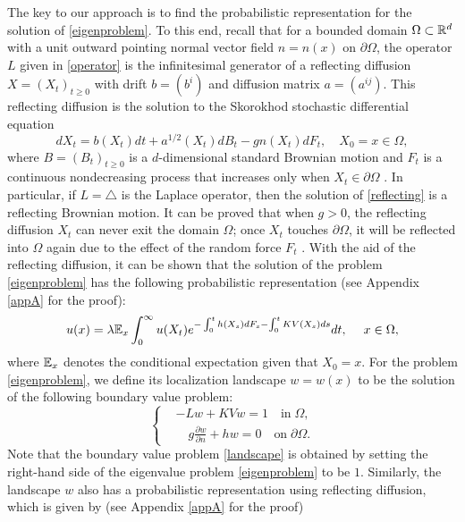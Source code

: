 \documentclass[a4paper,11pt]{article}
\begin{document}
The key to our approach is to find the probabilistic representation for the solution of \eqref{eigenproblem}. To this end, recall that for a bounded domain $\Omega \subset \mathbb{R}^d$ with a unit outward pointing normal vector field $n = n(x)$ on $\partial \Omega$, the operator $L$ given in \eqref{operator} is the infinitesimal generator of a reflecting diffusion $X = (X_t)_{t \geq 0}$ with drift $b = (b^i)$ and diffusion matrix $a = (a^{ij})$. This reflecting diffusion is the solution to the Skorokhod stochastic differential equation
\begin{equation}\label{reflecting}
dX_t = b(X_t) dt + a^{1/2}(X_t) d B_t - g n(X_t) d F_t, \quad X_0 = x\in\Omega,
\end{equation}
where $B = (B_t)_{t\geq 0}$ is a $d$-dimensional standard Brownian motion and $F_t$ is a continuous nondecreasing process that increases only when $X_t \in \partial \Omega$ \cite{1998Diffusions}. In particular, if $L = \triangle$ is the Laplace operator, then the solution of \eqref{reflecting} is a reflecting Brownian motion. It can be proved that when $g > 0$, the reflecting diffusion $X_t$ can never exit the domain $\Omega$; once $X_t$ touches $\partial \Omega$, it will be reflected into $\Omega$ again due to the effect of the random force $F_t$ \cite{1998Diffusions}. With the aid of the reflecting diffusion, it can be shown that the solution of the problem \eqref{eigenproblem} has the following probabilistic representation (see Appendix \ref{appA} for the proof):
\begin{equation}\label{probeigen}
u(x) = \lambda \mathbb{E}_x \int_{0}^{\infty} u(X_t) e^{- \int_{0}^{t} h(X_s) d F_s - \int_{0}^{t} K V(X_s) ds} dt, \quad \; x \in \Omega,
\end{equation}
where $\mathbb{E}_x$ denotes the conditional expectation given that $X_0 = x$. For the problem \eqref{eigenproblem}, we define its localization landscape $w = w(x)$ to be the solution of the following boundary value problem:
\begin{equation}\label{landscape}
\left\{
\begin{split}
& - L w + K V w = 1 \quad \textrm{in} \; \Omega, \\
& \quad g \frac{\partial w}{\partial n} + h w = 0 \quad \textrm{on} \; \partial \Omega.
\end{split}
\right.
\end{equation}
Note that the boundary value problem \eqref{landscape} is obtained by setting the right-hand side of the eigenvalue problem \eqref{eigenproblem} to be $1$. Similarly, the landscape $w$ also has a probabilistic representation using reflecting diffusion, which is given by (see Appendix \ref{appA} for the proof)
\end{document}
